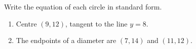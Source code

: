 Write the equation of each circle in standard form.
\begin{enumerate}
\item Centre $(9,12)$, tangent to the line $y=8$.
\item The endpoints of a diameter are $(7,14)$ and $(11,12)$.
\end{enumerate}
